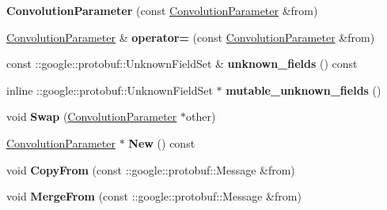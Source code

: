 \begin{DoxyCompactItemize}
\mbox{\label{classcaffe_1_1_convolution_parameter_a412fb8d8524721901c37e8bbb0eeb3d8}} 
{\bfseries Convolution\+Parameter} (const \mbox{\hyperlink{classcaffe_1_1_convolution_parameter}{Convolution\+Parameter}} \&from)
\item 
\mbox{\label{classcaffe_1_1_convolution_parameter_a156d4a159e231e24cd20216f23bbed76}} 
\mbox{\hyperlink{classcaffe_1_1_convolution_parameter}{Convolution\+Parameter}} \& {\bfseries operator=} (const \mbox{\hyperlink{classcaffe_1_1_convolution_parameter}{Convolution\+Parameter}} \&from)
\item 
\mbox{\label{classcaffe_1_1_convolution_parameter_a99400e24fd00be6433df17f781eee7cf}} 
const \+::google\+::protobuf\+::\+Unknown\+Field\+Set \& {\bfseries unknown\+\_\+fields} () const
\item 
\mbox{\label{classcaffe_1_1_convolution_parameter_abbbeb669dd5866a2cabd8dfc6b374bf4}} 
inline \+::google\+::protobuf\+::\+Unknown\+Field\+Set $\ast$ {\bfseries mutable\+\_\+unknown\+\_\+fields} ()
\item 
\mbox{\label{classcaffe_1_1_convolution_parameter_aaa0bcc3b8e62858f40ca9a7a2d71c08f}} 
void {\bfseries Swap} (\mbox{\hyperlink{classcaffe_1_1_convolution_parameter}{Convolution\+Parameter}} $\ast$other)
\item 
\mbox{\label{classcaffe_1_1_convolution_parameter_a04a8da9fd6f7d735323774213aee1cba}} 
\mbox{\hyperlink{classcaffe_1_1_convolution_parameter}{Convolution\+Parameter}} $\ast$ {\bfseries New} () const
\item 
\mbox{\label{classcaffe_1_1_convolution_parameter_ae26987c4374bf82b636510a815a7e014}} 
void {\bfseries Copy\+From} (const \+::google\+::protobuf\+::\+Message \&from)
\item 
\mbox{\label{classcaffe_1_1_convolution_parameter_ad94454ceb4b79f410b54f18a865a1a17}} 
void {\bfseries Merge\+From} (const \+::google\+::protobuf\+::\+Message \&from)

\end{DoxyCompactItemize}
